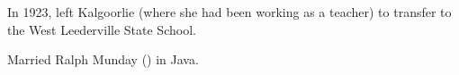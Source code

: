 
In 1923, left Kalgoorlie (where she had been working as a teacher) to transfer to the West Leederville State School.\cite{VMkal}

Married Ralph Munday () in Java.\cite{LadiesSection}
